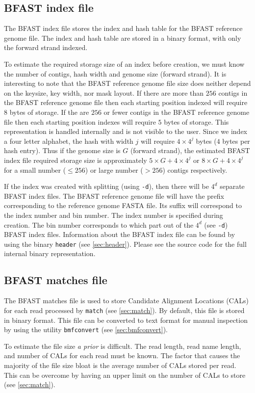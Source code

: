 \documentclass[a4paper,12pt]{book}
\newcommand{\TT}[1]{{\tt #1}} %
\newcommand{\IF}[1]{{\it #1}} %
\newcommand{\rGFF}{reference genome FASTA file}
\newcommand{\BRGF}{BFAST reference genome file} %
\newcommand{\BIF}{BFAST index file} %
\newcommand{\BMF}{BFAST matches file} %
\begin{document}
\subsection{\BIF{}}
\label{sec:bif}
The \BIF{} stores the index and hash table for the \BRGF{}.
The index and hash table are stored in a binary format, with only the forward strand indexed.

To estimate the required storage size of an index before creation, we must know the number of contigs, hash width and genome size (forward strand).
It is interesting to note that the \BRGF{} size does neither depend on the keysize, key width, nor mask layout. 
If there are more than $256$ contigs in the \BRGF{} then each starting position indexed will require $8$ bytes of storage.
If the are $256$ or fewer contigs in the \BRGF{} then each starting position indexes will require $5$ bytes of storage.
This representation is handled internally and is not visible to the user.
Since we index a four letter alphabet, the hash with width $j$ will require $4\times4^j$ bytes ($4$ bytes per hash entry).
Thus if the genome size is $G$ (forward strand), the estimated \BIF{} required storage size is approximately $5\times G + 4\times 4^j$ or $8\times G + 4\times 4^j$ for a small number ($\leq 256$) or large number ($>256$) contigs respectively. 

If the index was created with splitting (using \TT{-d}), then there will be $4^d$ separate \BIF{s}.
The \BRGF{} will have the prefix corresponding to the \rGFF{}.
Its suffix will correspond to the index number and bin number.
The index number is specified during creation.
The bin number corresponds to which part out of the $4^d$ (see \TT{-d}) \BIF{s}.
Information about the \BIF{} can be found by using the binary \TT{header} (see \autoref{sec:header}).
Please see the source code for the full internal binary representation.

\subsection{\BMF{}}
\label{sec:bmf}
The \BMF{} is used to store Candidate Alignment Locations (CALs) for each read processed by \TT{match} (see \autoref{sec:match}).
By default, this file is stored in binary format.
This file can be converted to text format for manual inspection by using the utility \TT{bmfconvert} (see \autoref{sec:bmfconvert}).

To estimate the file size \IF{a prior} is difficult.
The read length, read name length, and number of CALs for each read must be known.
The factor that causes the majority of the file size bloat is the average number of CALs stored per read.
This can be overcome by having an upper limit on the number of CALs to store (see \autoref{sec:match}).
\end{document}
